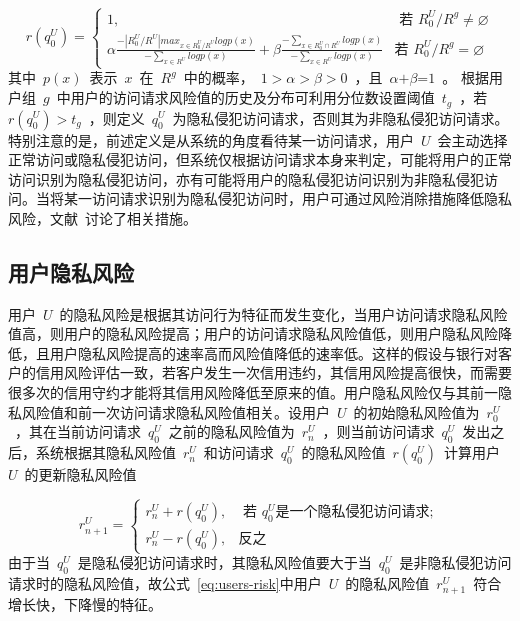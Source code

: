\begin{equation}
r(q_{0}^{U})=\begin{cases}
1, & \text{ 若 } R_{0}^{U}/{{R}^{g}}\ne \varnothing \\ 
\alpha \frac{-|R_{0}^{U}/{R}^{U}|max_{x\in R_{0}^{U}/{R}^{U}}logp(x)}{-\sum_{x\in{R^U}}logp(x)}+ \beta \frac{-\sum_{x\in R_0^U \cap  R^U}logp(x)}{-\sum_{x\in  R^U}logp(x)}& \text{若 } R_{0}^{U}/{{R}^{g}}=\varnothing 
\end{cases}
\end{equation}
其中~$p(x)$~表示~$x$~在~$R_{{}}^{g}$~中的概率，~$1>\alpha >\beta >0$~，且~$\alpha \text{+}\beta \text{=}1$~。
根据用户组~$g$~中用户的访问请求风险值的历史及分布可利用分位数设置阈值~${{t}_{g}}$~，若~$r(q_{0}^{U})>{{t}_{g}}$~，则定义~$q_{0}^{U}$~为隐私侵犯访问请求，否则其为非隐私侵犯访问请求。特别注意的是，前述定义是从系统的角度看待某一访问请求，用户~$U$~会主动选择正常访问或隐私侵犯访问，但系统仅根据访问请求本身来判定，可能将用户的正常访问识别为隐私侵犯访问，亦有可能将用户的隐私侵犯访问识别为非隐私侵犯访问。当将某一访问请求识别为隐私侵犯访问时，用户可通过风险消除措施降低隐私风险，文献~\cite{diaz-lopez2016dynamic}讨论了相关措施。

\subsection{用户隐私风险}
用户~$U$~的隐私风险是根据其访问行为特征而发生变化，当用户访问请求隐私风险值高，则用户的隐私风险提高；用户的访问请求隐私风险值低，则用户隐私风险降低，且用户隐私风险提高的速率高而风险值降低的速率低。这样的假设与银行对客户的信用风险评估一致，若客户发生一次信用违约，其信用风险提高很快，而需要很多次的信用守约才能将其信用风险降低至原来的值。用户隐私风险仅与其前一隐私风险值和前一次访问请求隐私风险值相关。设用户~$U$~的初始隐私风险值为~$r_{0}^{U}$~，其在当前访问请求~$q_{0}^{U}$~之前的隐私风险值为~$r_{n}^{U}$~，则当前访问请求~$q_{0}^{U}$~发出之后，系统根据其隐私风险值~$r_{n}^{U}$~和访问请求~$q_{0}^{U}$~的隐私风险值~$r(q_{0}^{U})$~计算用户~$U$~的更新隐私风险值

\begin{equation}\label{eq:users-risk}
r_{n+1}^{U}=\begin{cases}
r_{n}^{U}+r(q_0^U), & \text{ 若 } q_0^U \text{是一个隐私侵犯访问请求}; \\ 
r_{n}^{U}-r(q_0^U),& \text{反之}
\end{cases}
\end{equation} 
由于当~$q_{0}^{U}$~是隐私侵犯访问请求时，其隐私风险值要大于当~$q_{0}^{U}$~是非隐私侵犯访问请求时的隐私风险值，故公式~\ref{eq:users-risk}中用户~$U$~的隐私风险值~$r_{n+1}^{U}$~符合增长快，下降慢的特征。

